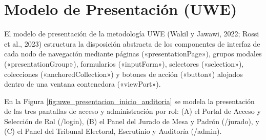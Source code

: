 \section{Modelo de Presentación (UWE)}
\label{sec:modelo_presentacion_uwe}

El modelo de presentación de la metodología UWE (Wakil y Jawawi, 2022; Rossi et al., 2023) estructura la disposición abstracta de los componentes de interfaz de cada nodo de navegación mediante páginas («presentationPage»), grupos modales («presentationGroup»), formularios («inputForm»), selectores («selection»), colecciones («anchoredCollection») y botones de acción («button») alojados dentro de una ventana contenedora («viewPort»).

En la Figura \ref{fig:uwe_presentacion_inicio_auditoria} se modela la presentación de las tres pantallas de acceso y administración por rol: (A) el Portal de Acceso y Selección de Rol (/login), (B) el Panel del Jurado de Mesa y Padrón (/jurado), y (C) el Panel del Tribunal Electoral, Escrutinio y Auditoría (/admin).

